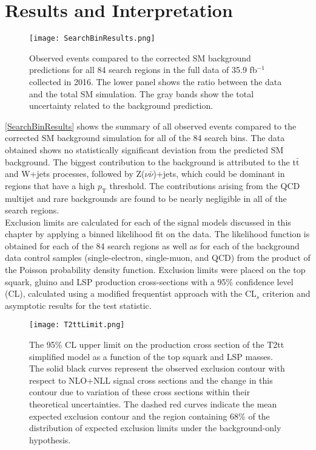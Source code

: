 \section{Results and Interpretation}

\begin{figure}[H]
\begin{center}
\texttt{[image: SearchBinResults.png]}  
\caption{Observed events compared to the corrected SM background predictions for all 84 search regions in the full data of 35.9 fb$^{-1}$ collected in 2016. The lower panel shows the ratio between the data and the total SM simulation. The gray bands show the total uncertainty related to the background prediction.}\label{SearchBinResults}
\end{center}
\end{figure}

\autoref{SearchBinResults} shows the summary of all observed events compared to the corrected SM background simulation for all of the 84 search bins. The data obtained shows no statistically significant deviation from the predicted SM background. The biggest contribution to the background is attributed to the t$\bar{\text{t}}$ and W+jets processes, followed by Z($\nu\bar{\nu}$)+jets, which could be dominant in regions that have a high $p_\text{T}$ threshold. The contributions arising from the QCD multijet and rare backgrounds are found to be nearly negligible in all of the search regions.\\

Exclusion limits are calculated for each of the signal models discussed in this chapter by applying a binned likelihood fit on the data. The likelihood function is obtained for each of the 84 search regions as well as for each of the background data control samples (single-electron, single-muon, and QCD) from the product of the Poisson probability density function. Exclusion limits were placed on the top squark, gluino and LSP production cross-sections with a 95\% confidence level (CL), calculated using a modified frequentist approach with the CL$_s$ criterion \cite{CL1,CL2} and asymptotic results for the test statistic\cite{stat1}.\\

\begin{figure}[H]
	\begin{center}
		\texttt{[image: T2ttLimit.png]} 
		\caption{The 95\% CL upper limit on the production cross section of the T2tt simplified model as a function of the top squark and LSP masses. The solid black curves represent the observed exclusion contour with respect to NLO+NLL\cite{NLONLL} signal cross sections and the change in this contour due to variation of these cross sections within their theoretical uncertainties. The dashed
red curves indicate the mean expected exclusion contour and the region containing 68\% of the
distribution of expected exclusion limits under the background-only hypothesis.}\label{T2ttLimit}
	\end{center}
\end{figure}

